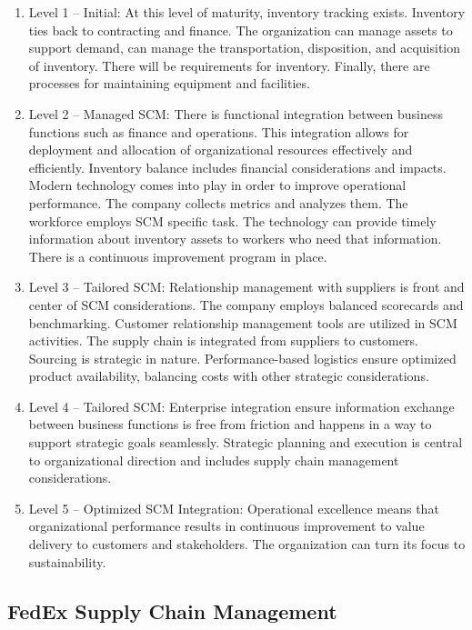 \documentclass[man]{apa7}
\begin{document}
\begin{enumerate}
\item Level 1 -- Initial: At this level of maturity, inventory tracking exists. Inventory ties back to contracting and finance. The organization can manage assets to support demand, can manage the transportation, disposition, and acquisition of inventory. There will be requirements for inventory. Finally, there are processes for maintaining equipment and facilities.
\item Level 2 -- Managed SCM: There is functional integration between business functions such as finance and operations. This integration allows for deployment and allocation of organizational resources effectively and efficiently. Inventory balance includes financial considerations and impacts. Modern technology comes into play in order to improve operational performance. The company collects metrics and analyzes them. The workforce employs SCM specific task. The technology can provide timely information about inventory assets to workers who need that information. There is a continuous improvement program in place.
\item Level 3 -- Tailored SCM: Relationship management with suppliers is front and center of SCM considerations. The company employs balanced scorecards and benchmarking. Customer relationship management tools are utilized in SCM activities. The supply chain is integrated from suppliers to customers. Sourcing is strategic in nature. Performance-based logistics ensure optimized product availability, balancing costs with other strategic considerations.
\item Level 4 -- Tailored SCM: Enterprise integration ensure information exchange between business functions is free from friction and happens in a way to support strategic goals seamlessly. Strategic planning and execution is central to organizational direction and includes supply chain management considerations.
\item Level 5 -- Optimized SCM Integration: Operational excellence means that organizational performance results in continuous improvement to value delivery to customers and stakeholders. The organization can turn its focus to sustainability.
\end{enumerate}

\subsection{FedEx Supply Chain Management}
\label{sec:org7421a2c}
\end{document}
